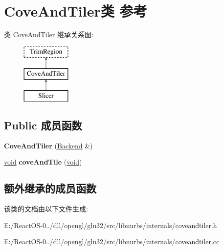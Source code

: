 \hypertarget{class_cove_and_tiler}{}\section{Cove\+And\+Tiler类 参考}
\label{class_cove_and_tiler}
类 Cove\+And\+Tiler 继承关系图\+:\begin{figure}[H]
\begin{center}
\leavevmode
\includegraphics[height=3.000000cm]{class_cove_and_tiler}
\end{center}
\end{figure}
\subsection*{Public 成员函数}
\begin{DoxyCompactItemize}
\item 
\mbox{\label{class_cove_and_tiler_aa9d1e2967b5e88e712da6857557288d2}} 
{\bfseries Cove\+And\+Tiler} (\hyperlink{class_backend}{Backend} \&)
\item 
\mbox{\label{class_cove_and_tiler_a4ee3ad2ea1aaa72039ca9725e6c8e775}} 
\hyperlink{interfacevoid}{void} {\bfseries cove\+And\+Tile} (\hyperlink{interfacevoid}{void})
\end{DoxyCompactItemize}
\subsection*{额外继承的成员函数}


该类的文档由以下文件生成\+:\begin{DoxyCompactItemize}
\item 
E\+:/\+React\+O\+S-\/0../dll/opengl/glu32/src/libnurbs/internals/coveandtiler.\+h\item 
E\+:/\+React\+O\+S-\/0../dll/opengl/glu32/src/libnurbs/internals/coveandtiler.\+cc\end{DoxyCompactItemize}
